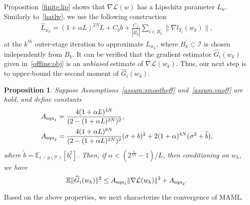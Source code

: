 \documentclass{osudissert96}
\newtheorem{proposition}{Proposition}
\begin{document}
Proposition~\ref{finite:lip} shows that $\nabla \mathcal{L}(w)$ has a Lipschitz parameter $L_{w}$. Similarly to~\cref{hatlw}, we use the following construction 
\begin{align}\label{hlwkoff}
\hat L_{w_k} =(1+\alpha L)^{2N}L + C_b b +  \frac{C_\mathcal{L}}{|B_k^\prime|}\sum_{i \in B_k^\prime}\|\nabla l_{T_i}(w_k)\|,
\end{align}
at the $k^{th}$ outer-stage iteration to approximate $L_{w_k}$, where $B_k^\prime \subset \mathcal{I}$ is  chosen independently from $B_k$. 
It can be verified that the gradient estimator $\widehat G_i(w_k)$ given in~\cref{offline:obj} is an {\em unbiased} estimate of  $\nabla \mathcal{L}(w_k)$. Thus, our next step is to upper-bound the second moment of $\widehat G_i(w_k)$.
\begin{proposition}\label{finite:seconderr} 
	Suppose Assumptions~\ref{assum:smoothoff} and~\ref{assum:vaoff} are hold, and define constants 	
\begin{align}\label{wocaopp}
A_{\text{\normalfont squ}_1} &= \frac{4(1+\alpha L)^{4N}}{(2-(1+\alpha L)^{2N})^2}, \nonumber
\\A_{\text{\normalfont squ}_2} &= \frac{4(1+\alpha L)^{8N}}{(2-(1+\alpha L)^{2N})^2}(\sigma+b)^2 + 2(1+\alpha)^{4N}(\sigma^2+\widetilde b),
	\end{align}
where  $\widetilde b =\mathbb{E}_{i\sim p(\mathcal{T})}[b_i^2]$. Then, if $\alpha < (2^{\frac{1}{2N}} - 1)/L$, then conditioning on $w_k$, we have 
	\begin{align*}
	\mathbb{E}\|\widehat G_i(w_k)\|^2 \leq A_{\text{\normalfont squ}_1} \|\nabla \mathcal{L}(w_k)\|^2 + A_{\text{\normalfont squ}_2}.
	\end{align*}
\end{proposition}
Based on the above properties, we next characterize the convergence of  MAML. 
\end{document}
